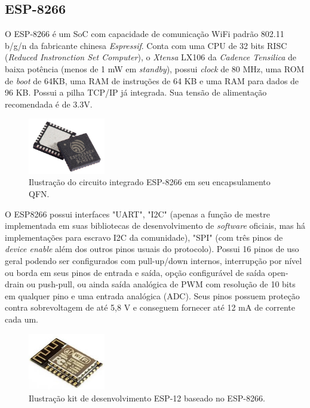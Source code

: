 \subsection{ESP-8266}

O ESP-8266 \cite{esp} é um \acf{SoC} com capacidade de comunicação \ac{WiFi} padrão 802.11 b/g/n da fabricante chinesa \textit{Espressif}. Conta com uma CPU de 32 bits RISC (\textit{Reduced Instronction Set Computer}), o \textit{Xtensa} LX106 da \textit{Cadence Tensilica} de baixa potência (menos de 1 mW em \textit{standby}), possui \textit{clock} de 80 MHz, uma ROM de \textit{boot} de 64KB, uma RAM de instruções de 64 KB e uma RAM para dados de 96 KB. Possui a pilha TCP/IP já integrada. Sua tensão de alimentação recomendada é de 3.3V.

\begin{figure}[ht]
    \begin{center}
    \includegraphics[width=0.3\textwidth]{figuras/esp8266.jpg}
    \end{center}
    \caption[ESP-8266 em seu encapsulamento QFN.]{Ilustração do circuito integrado ESP-8266 em seu encapsulamento QFN.}
    \label{esp8266}
\end{figure}

O ESP8266 possui interfaces "UART", "I2C" (apenas a função de mestre implementada em suas bibliotecas de desenvolvimento de \textit{software} oficiais, mas há implementações para escravo I2C da comunidade), "SPI" (com três pinos de \textit{device enable} além dos outros pinos usuais do protocolo). Possui 16 pinos de uso geral podendo ser configurados com pull-up/down internos, interrupção por nível ou borda em seus pinos de entrada e saída, opção configurável de saída open-drain ou push-pull, ou ainda saída analógica de PWM com resolução de 10 bits em qualquer pino e uma entrada analógica (ADC). Seus pinos possuem proteção contra sobrevoltagem de até 5,8 V e conseguem fornecer até 12 mA de corrente cada um.

\begin{figure}[ht]
    \begin{center}
    \includegraphics[width=0.3\textwidth]{figuras/esp12.jpg}
    \end{center}
    \caption[Kit de desenvolvimento ESP-12.]{Ilustração kit de desenvolvimento ESP-12 baseado no ESP-8266.}
    \label{esp12}
\end{figure}

